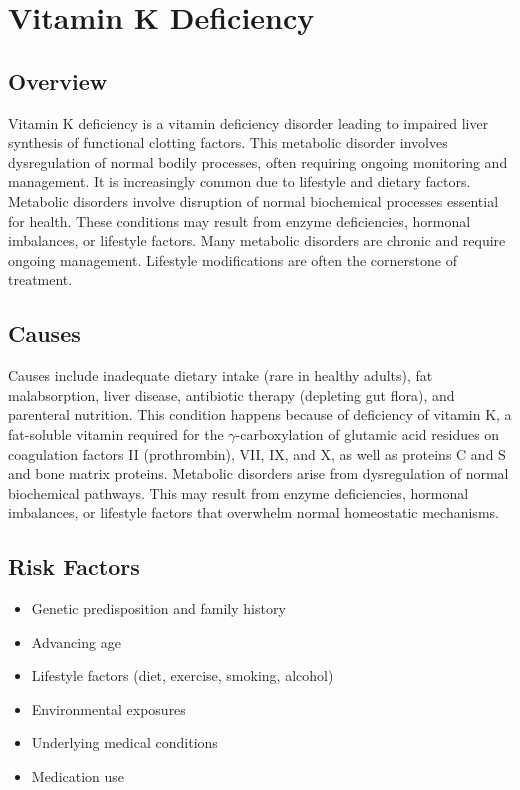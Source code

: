 \chapter{Vitamin K Deficiency}
\label{sec:Vitamin K Deficiency}

\section{Overview}
Vitamin K deficiency is a vitamin deficiency disorder leading to impaired liver synthesis of functional clotting factors. This metabolic disorder involves dysregulation of normal bodily processes, often requiring ongoing monitoring and management. It is increasingly common due to lifestyle and dietary factors. Metabolic disorders involve disruption of normal biochemical processes essential for health. These conditions may result from enzyme deficiencies, hormonal imbalances, or lifestyle factors. Many metabolic disorders are chronic and require ongoing management. Lifestyle modifications are often the cornerstone of treatment.
\section{Causes}
Causes include inadequate dietary intake (rare in healthy adults), fat malabsorption, liver disease, antibiotic therapy (depleting gut flora), and parenteral nutrition. This condition happens because of deficiency of vitamin K, a fat-soluble vitamin required for the $\gamma$-carboxylation of glutamic acid residues on coagulation factors II (prothrombin), VII, IX, and X, as well as proteins C and S and bone matrix proteins. Metabolic disorders arise from dysregulation of normal biochemical pathways. This may result from enzyme deficiencies, hormonal imbalances, or lifestyle factors that overwhelm normal homeostatic mechanisms.   
\section{Risk Factors}
\begin{itemize}[noitemsep]
  \item Genetic predisposition and family history
  \item Advancing age
  \item Lifestyle factors (diet, exercise, smoking, alcohol)
  \item Environmental exposures
  \item Underlying medical conditions
  \item Medication use
\end{itemize}
